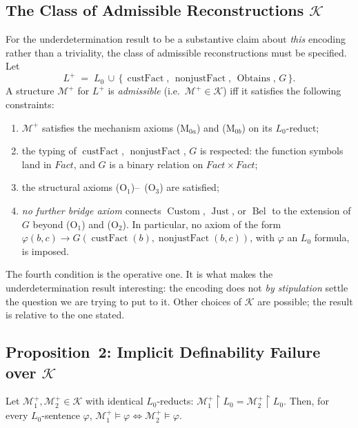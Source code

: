 \subsection{The Class of Admissible Reconstructions $\mathcal K$}
\label{sec:admissible}

For the underdetermination result to be a substantive claim about
\emph{this} encoding rather than a triviality, the class of
admissible reconstructions must be specified. Let
\[
L^+ \;=\; L_0 \,\cup\,
\{\,\operatorname{custFact},\,
  \operatorname{nonjustFact},\,
  \operatorname{Obtains},\,
  G \,\}.
\]
A structure $\mathcal M^+$ for $L^+$ is \emph{admissible} (i.e.\
$\mathcal M^+\in\mathcal K$) iff it satisfies the following
constraints:
\begin{enumerate}
\item $\mathcal M^+$ satisfies the mechanism axioms (M$_{0a}$) and
      (M$_{0b}$) on its $L_0$-reduct;
\item the typing of $\operatorname{custFact}$,
      $\operatorname{nonjustFact}$, $G$ is respected: the function
      symbols land in $\mathit{Fact}$, and $G$ is a binary relation
      on $\mathit{Fact}\times\mathit{Fact}$;
\item the structural axioms (O$_1$)--~(O$_3$) are satisfied;
\item \emph{no further bridge axiom} connects
      $\operatorname{Custom}$, $\operatorname{Just}$, or
      $\operatorname{Bel}$ to the extension of $G$ beyond (O$_1$)
      and (O$_2$). In particular, no axiom of the form
      $\varphi(b,c)\rightarrow G(\operatorname{custFact}(b),
      \operatorname{nonjustFact}(b,c))$, with $\varphi$ an $L_0$
      formula, is imposed.
\end{enumerate}
The fourth condition is the operative one. It is what makes the
underdetermination result interesting: the encoding does not
\emph{by stipulation} settle the question we are trying to put to
it. Other choices of $\mathcal K$ are possible; the result is
relative to the one stated.

\subsection{Proposition~2: Implicit Definability Failure over $\mathcal K$}
\label{sec:prop2}

\begin{lemma}
\label{lem:reduct-invariance}
Let $\mathcal M_1^+,\mathcal M_2^+\in\mathcal K$ with identical
$L_0$-reducts:
$\mathcal M_1^+\!\upharpoonright L_0
 =\mathcal M_2^+\!\upharpoonright L_0$.
Then, for every $L_0$-sentence $\varphi$,
$\mathcal M_1^+\models\varphi \Leftrightarrow
 \mathcal M_2^+\models\varphi$.
\end{lemma}

